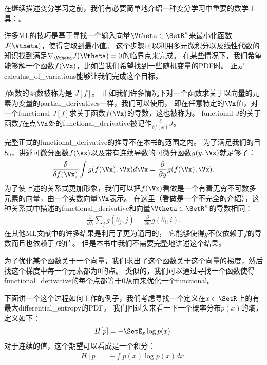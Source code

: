 在继续描述变分学习之前，我们有必要简单地介绍一种变分学习中重要的数学工具：。


许多\gls{ML}的技巧是基于寻找一个输入向量$\Vtheta\in\SetR^n$来最小化函数$J(\Vtheta)$，使得它取到最小值。
这个步骤可以利用多元微积分以及线性代数的知识找到满足$\nabla_{\Vtheta} J(\Vtheta) = 0$的临界点来完成。
在某些情况下，我们希望能够解一个函数$f(\Vx)$，比如当我们希望找到一些随机变量的\gls{PDF}时。
正是\gls{calculus_of_variations}能够让我们完成这个目标。



$f$函数的函数被称为是 $J[f]$。
正如我们许多情况下对一个函数求关于以向量的元素为变量的\gls{partial_derivatives}一样，我们可以使用，
即在任意特定的$\Vx$值，对一个\gls{functional} $J[f]$求关于函数$f(\Vx)$的导数，这也被称为。
\gls{functional} $J$的关于函数$f$在点$\Vx$处的\gls{functional_derivative}被记作$\frac{\delta}{\delta f(x)}J$。



完整正式的\gls{functional_derivative}的推导不在本书的范围之内。
为了满足我们的目标，讲述可微分函数$f(\Vx)$以及带有连续导数的可微分函数$g(y,\Vx)$就足够了：
\begin{align}
	\frac{\delta}{\delta f(\Vx)} \int g(f(\Vx),\Vx)d\Vx = \frac{\partial}{\partial y}g(f(\Vx),\Vx).
\end{align}
为了使上述的关系式更加形象，我们可以把$f(\Vx)$看做是一个有着无穷不可数多元素的向量，由一个实数向量$\Vx$表示。
在这里（看做是一个不完全的介绍），这种关系式中描述的\gls{functional_derivative}和向量$\Vtheta\in\SetR^n$的导数相同：
\begin{align}
	\frac{\partial}{\partial \theta_i}\sum_{j}^{}g(\theta_j,j) = \frac{\partial}{\partial \theta_i}g(\theta_i,i).
\end{align}
在其他\gls{ML}文献中的许多结果是利用了更为通用的，
它能够使得$g$不仅依赖于$f$的导数而且也依赖于$f$的值。
但是本书中我们不需要完整地讲述这个结果。


为了优化某个函数关于一个向量，我们求出了这个函数关于这个向量的梯度，然后找这个梯度中每一个元素都为$0$的点。
类似的，我们可以通过寻找一个函数使得\gls{functional_derivative}的每个点都等于$0$从而来优化一个\gls{functional}。


下面讲一个这个过程如何工作的例子，我们考虑寻找一个定义在$x\in\SetR$上的有最大\gls{differential_entropy}的\gls{PDF}。
我们回过头来看一下一个概率分布$p(x)$的熵，定义如下：
\begin{align}
	H[p] = - \SetE_x \log p(x).
\end{align}
对于连续的值，这个期望可以看成是一个积分：
\begin{align}
	H[p] = - \int p(x) \log p(x) dx.
\end{align}


